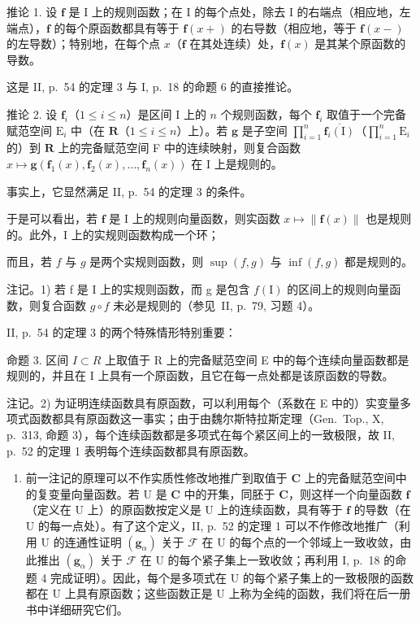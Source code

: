 推论 1. 设 \(\mathbf{f}\) 是 I 上的规则函数；在 I 的每个点处，除去 I 的右端点（相应地，左端点），\(\mathbf{f}\) 的每个原函数都具有等于 \(\mathbf{f}(x+)\) 的右导数（相应地，等于 \(\mathbf{f}(x-)\) 的左导数）；特别地，在每个点 \(x\)（\(\mathbf{f}\) 在其处连续）处，\(\mathbf{f}(x)\) 是其某个原函数的导数。

这是 II, p.~54 的定理 3 与 I, p.~18 的命题 6 的直接推论。

推论 2. 设 \(\mathbf{f}_i\)（\(1 \leqslant i \leqslant n\)）是区间 I 上的 \(n\) 个规则函数，每个 \(\mathbf{f}_i\) 取值于一个完备赋范空间 \(\mathrm{E}_i\) 中（在 \(\mathbf{R}\)（\(1 \leqslant i \leqslant n\)）上）。若 \(\mathbf{g}\) 是子空间 \(\prod_{i=1}^{n} \overline{\mathbf{f}_i(\mathrm{I})}\)（\(\prod_{i=1}^{n} \mathrm{E}_i\) 的）到 \(\mathbf{R}\) 上的完备赋范空间 F 中的连续映射，则复合函数 \(x \mapsto \mathbf{g}(\mathbf{f}_1(x), \mathbf{f}_2(x), \ldots, \mathbf{f}_n(x))\) 在 I 上是规则的。

事实上，它显然满足 II, p.~54 的定理 3 的条件。

于是可以看出，若 \(\mathbf{f}\) 是 I 上的规则向量函数，则实函数 \(x\mapsto \| \mathbf{f}(x)\|\) 也是规则的。此外，I 上的实规则函数构成一个环；

而且，若 \(f\) 与 \(g\) 是两个实规则函数，则 \(\sup(f, g)\) 与 \(\inf(f, g)\) 都是规则的。

注记。1) 若 f 是 I 上的实规则函数，而 g 是包含 \(f(\mathrm{I})\) 的区间上的规则向量函数，则复合函数 \(g \circ f\) 未必是规则的（参见~II, p.~79, 习题 4）。

II, p.~54 的定理 3 的两个特殊情形特别重要：

命题 3. 区间 \(I \subset R\) 上取值于 R 上的完备赋范空间 E 中的每个连续向量函数都是规则的，并且在 I 上具有一个原函数，且它在每一点处都是该原函数的导数。

注记。2) 为证明连续函数具有原函数，可以利用每个（系数在 E 中的）实变量多项式函数都具有原函数这一事实；由于由魏尔斯特拉斯定理（Gen.~Top., X, p.~313, 命题 3），每个连续函数都是多项式在每个紧区间上的一致极限，故 II, p.~52 的定理 1 表明每个连续函数都具有原函数。

\begin{enumerate}
\def\labelenumi{\arabic{enumi})}
\setcounter{enumi}{2}
\tightlist
\item
  前一注记的原理可以不作实质性修改地推广到取值于 \(\mathbf{C}\) 上的完备赋范空间中的复变量向量函数。若 \(\mathrm{U}\) 是 \(\mathbf{C}\) 中的开集，同胚于 \(\mathbf{C}\)，则这样一个向量函数 \(\mathbf{f}\)（定义在 \(\mathrm{U}\) 上）的原函数按定义是 \(\mathrm{U}\) 上的连续函数，具有等于 \(\mathbf{f}\) 的导数（在 \(\mathrm{U}\) 的每一点处）。有了这个定义，II, p.~52 的定理 1 可以不作修改地推广（利用 \(\mathrm{U}\) 的连通性证明 \((\mathbf{g}_{\alpha})\) 关于 \(\mathcal{F}\) 在 \(\mathrm{U}\) 的每个点的一个邻域上一致收敛，由此推出 \((\mathbf{g}_{\alpha})\) 关于 \(\mathcal{F}\) 在 \(\mathrm{U}\) 的每个紧子集上一致收敛；再利用 I, p.~18 的命题 4 完成证明）。因此，每个是多项式在 \(\mathrm{U}\) 的每个紧子集上的一致极限的函数都在 \(\mathrm{U}\) 上具有原函数；这些函数正是 \(\mathrm{U}\) 上称为全纯的函数，我们将在后一册书中详细研究它们。
\end{enumerate}

